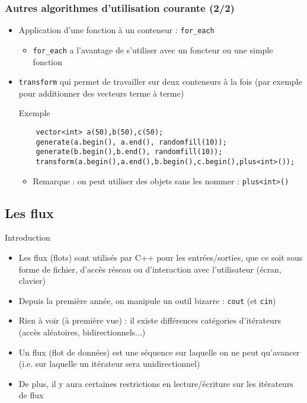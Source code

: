 \begin{frame}[fragile]\frametitle{Autres algorithmes d'utilisation courante (2/2)}
\begin{itemize}
\item Application d'une fonction à un conteneur : \verb|for_each| 
\begin{itemize}
\item \verb|for_each| a l'avantage de s'utiliser avec un foncteur ou une simple fonction
\end{itemize}
\item \verb|transform|  qui permet de travailler sur deux conteneurs à la fois (par exemple pour additionner des vecteurs terme à terme)
\begin{codeblock}{Exemple}
\begin{lstlisting}
    vector<int> a(50),b(50),c(50);
    generate(a.begin(), a.end(), randomfill(10));
    generate(b.begin(),b.end(), randomfill(10));
    transform(a.begin(),a.end(),b.begin(),c.begin(),plus<int>());
\end{lstlisting}
\end{codeblock}
\begin{itemize}
\item Remarque : on peut utiliser des objets sans les nommer : \verb|plus<int>()|
\end{itemize}
\end{itemize}
\end{frame}

\subsection{Les flux}

\begin{frame}{Introduction}
\begin{itemize}
\item Les flux (flots) sont utilisés par C++ pour les entrées/sorties, que ce soit sous forme de fichier, d'accès réseau ou d'interaction avec l'utilisateur (écran, clavier)
\item Depuis la première année, on manipule un outil bizarre : \texttt{cout} (et \texttt{cin})
\item Rien à voir (à première vue) : il existe différences catégories d'itérateurs (accès aléatoires, bidirectionnels...)
\item Un flux (flot de données) est une séquence sur laquelle on ne peut qu'avancer (i.e. sur laquelle un itérateur sera unidirectionnel)
\item De plus, il y aura certaines restrictions en lecture/écriture sur les itérateurs de flux
\end{itemize}
\end{frame}

